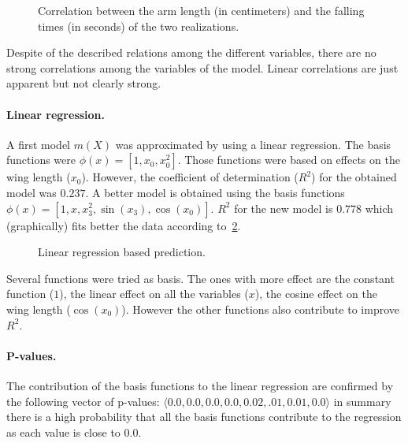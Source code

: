 \begin{figure}
  \centering
  
  \caption{Correlation between the arm length (in centimeters) and the falling
  times (in seconds) of the two realizations.}
  \label{fig_al_times}
\end{figure}

Despite of the described relations among the different variables, there are no
strong correlations among the variables of the model. Linear correlations are
just apparent but not clearly strong.

\paragraph{Linear regression.} A first model $m(X)$ was approximated by using a
linear regression. The basis functions were $\phi(x) = [1, x_0, x_0^2]$. Those
functions were based on effects on the wing length ($x_0$). However, the
coefficient of determination ($R^2$) for the obtained model was $0.237$. A
better model is obtained using the basis functions $\phi(x) = [1, x, x_3^2,
\sin(x_3), \cos(x_0)]$. $R^2$  for the new model is $0.778$ which (graphically)
fits better the data according to~\cref{fig_goodlr}.
\begin{figure}
  \centering
  
  \caption{Linear regression based prediction.}
  \label{fig_goodlr}
\end{figure}

\begin{comment}
  \begin{figure}
    \centering
    
    \caption{Comparison between the times measured in the two realizations.}
    \label{fig_badlr}
  \end{figure}
\end{comment}
Several functions were tried as basis. The ones with more effect are the
constant function ($1$), the linear effect on all the variables ($x$), the
cosine effect on the wing length ($\cos(x_0)$). However the other functions also
contribute to improve $R^2$.

\paragraph{P-values.} The contribution of the basis functions to the linear
regression are confirmed by the following vector of p-values: $\langle 0.0,
0.0, 0.0, 0.0, 0.02, .01, 0.01, 0.0 \rangle$ in summary there is a
high probability that all the basis functions contribute to the regression as
each value is close to $0.0$.

